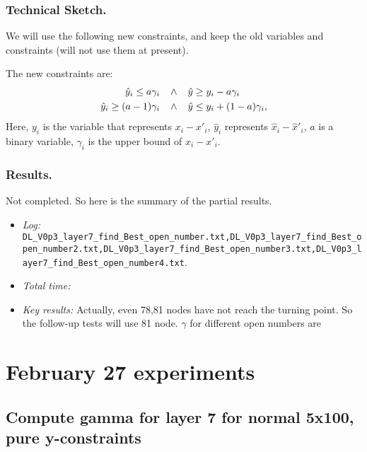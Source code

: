 \documentclass{llncs}
\begin{document}
\subsubsection*{Technical Sketch.}

We will use the following new constraints, and keep the old variables and constraints (will not use them at present).

The new constraints are: \begin{align*}
	\hat{y}_i \leq a \gamma_i \hspace*{2ex} &\wedge \hspace*{2ex}\hat{y} \geq y_i - a \gamma_i\\
	\hat{y}_i \geq (a-1) \gamma_i  \hspace*{2ex} &\wedge \hspace*{2ex} \hat{y} \leq y_i + (1-a) \gamma_i,
\end{align*} Here, $y_i$ is the variable that represents $x_i-x'_i$, $\hat{y}_i$ represents $\hat{x}_i-\hat{x}'_i$, $a$ is a binary variable, $\gamma_i$ is the upper bound of $x_i-x'_i$.



\subsubsection*{Results.}

Not completed. So here is the summary of the partial results.

\begin{itemize}
	\item \emph{Log:} \verb*|DL_V0p3_layer7_find_Best_open_number.txt,DL_V0p3_layer7_find_Best_open_number2.txt,DL_V0p3_layer7_find_Best_open_number3.txt,DL_V0p3_layer7_find_Best_open_number4.txt|.
	
	\item \emph{Total time:} 
	
	\item \emph{Key results:} Actually, even 78,81 nodes have not reach the turning point. So the follow-up tests will use 81 node. $\gamma$ for different open numbers are
	
\end{itemize}


\section{February 27 experiments}

\subsection{Compute gamma for layer 7 for normal 5x100, pure y-constraints}
\end{document}
